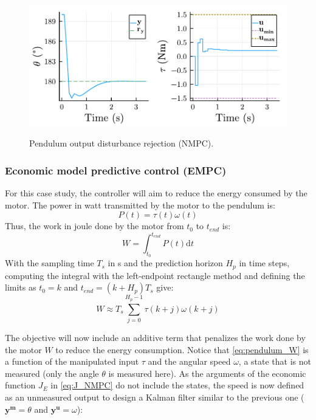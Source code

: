 \begin{figure}[t]
    \centering
    \caption{Pendulum output disturbance rejection (NMPC).}
    \includegraphics[width=0.5\columnwidth]{fig/plot_NonLinMPC3.pdf}
    \label{fig:plot_NonLinMPC3}
\end{figure}

\subsubsection{Economic model predictive control (EMPC)}

For this case study, the controller will aim to reduce the energy consumed by the motor. The power in watt transmitted by the motor to the pendulum is:
\begin{equation}
P(t) = \tau(t) \omega(t) 
\end{equation}
Thus, the work in joule done by the motor from $t_0$ to $t_{end}$ is:
\begin{equation}
W = \int_{t_0}^{t_{end}} P(t) \mathrm{d}t 
\end{equation}
With the sampling time $T_s$ in \si{\second} and the prediction horizon $H_p$ in time steps, computing the integral with the left-endpoint rectangle method and defining the limits as $t_0=k$ and $t_{end} = (k + H_p) T_s$ give:
\begin{equation}\label{eq:pendulum_W}
W \approx T_s \sum_{j = 0}^{H_p - 1} \tau(k+j) \omega(k+j) 
\end{equation}

The objective will now include an additive term that penalizes the work done by the motor $W$ to reduce the energy consumption. Notice that \eqref{eq:pendulum_W} is a function of the manipulated input $\tau$ and the angular speed $\omega$, a state that is not measured (only the angle $\theta$ is measured here). As the arguments of the economic function $J_E$ in \eqref{eq:J_NMPC} do not include the states, the speed is now defined as an unmeasured output to design a Kalman filter similar to the previous one ($\mathbf{y^m} = \theta$ and $\mathbf{y^u} = \omega$): 

